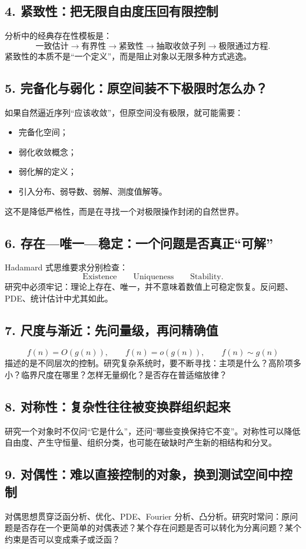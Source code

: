 \documentclass[11pt,a4paper]{ctexart}
\begin{document}
\subsection{4. 紧致性：把无限自由度压回有限控制}
分析中的经典存在性模板是：
\[
\text{一致估计}
\to\text{有界性}
\to\text{紧致性}
\to\text{抽取收敛子列}
\to\text{极限通过方程}.
\]
紧致性的本质不是“一个定义”，而是阻止对象以无限多种方式逃逸。

\subsection{5. 完备化与弱化：原空间装不下极限时怎么办？}
如果自然逼近序列“应该收敛”，但原空间没有极限，就可能需要：
\begin{itemize}
  \item 完备化空间；
  \item 弱化收敛概念；
  \item 弱化解的定义；
  \item 引入分布、弱导数、弱解、测度值解等。
\end{itemize}
这不是降低严格性，而是在寻找一个对极限操作封闭的自然世界。

\subsection{6. 存在—唯一—稳定：一个问题是否真正“可解”}
Hadamard 式思维要求分别检查：
\[
\boxed{\text{Existence}}\qquad
\boxed{\text{Uniqueness}}\qquad
\boxed{\text{Stability}}.
\]
研究中必须牢记：理论上存在、唯一，并不意味着数值上可稳定恢复。反问题、PDE、统计估计中尤其如此。

\subsection{7. 尺度与渐近：先问量级，再问精确值}
\[
f(n)=O(g(n)),\qquad f(n)=o(g(n)),\qquad f(n)\sim g(n)
\]
描述的是不同层次的控制。研究复杂系统时，要不断寻找：主项是什么？高阶项多小？临界尺度在哪里？怎样无量纲化？是否存在普适缩放律？

\subsection{8. 对称性：复杂性往往被变换群组织起来}
研究一个对象时不仅问“它是什么”，还问“哪些变换保持它不变”。对称性可以降低自由度、产生守恒量、组织分类，也可能在破缺时产生新的相结构和分叉。

\subsection{9. 对偶性：难以直接控制的对象，换到测试空间中控制}
对偶思想贯穿泛函分析、优化、PDE、Fourier 分析、凸分析。研究时常问：原问题是否存在一个更简单的对偶表述？某个存在问题是否可以转化为分离问题？某个约束是否可以变成乘子或泛函？
\end{document}
